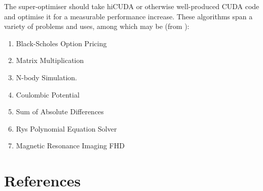 \documentclass[letterpaper,twocolumn,10pt]{article}
\begin{document}
The super-optimiser should take hiCUDA or otherwise
well-produced CUDA code and optimise it for
a measurable performance increase.
These algorithms span a variety of problems and uses,
among which may be (from \cite{hicuda}):
\begin{enumerate}
    \item Black-Scholes Option Pricing
    \item Matrix Multiplication
    \item N-body Simulation.
    \item Coulombic Potential
    \item Sum of Absolute Differences
    \item Rys Polynomial Equation Solver
    \item Magnetic Resonance Imaging FHD
\end{enumerate}

\section{References}


\end{document}
